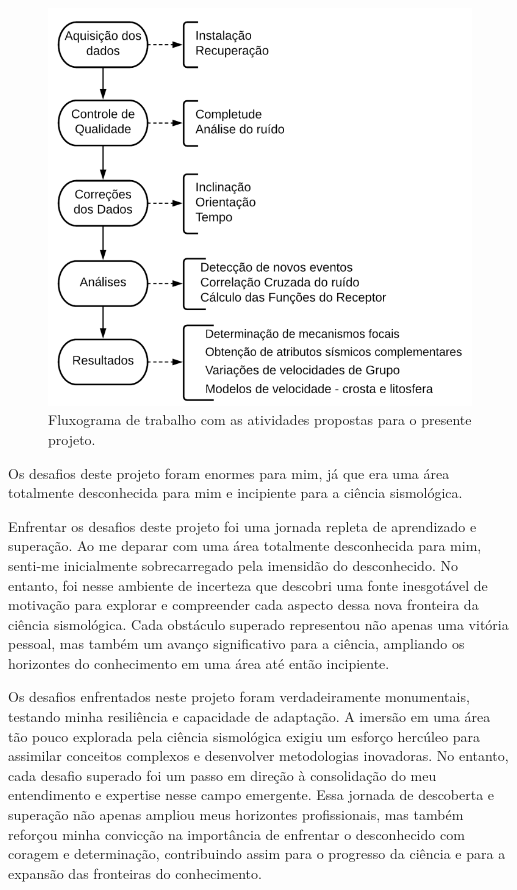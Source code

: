\documentclass[10pt,a4paper,oneside]{book}
\begin{document}
\begin{figure}[h!]
  \begin{center}
    \includegraphics[width=\textwidth]{images/fluxograma_posdoc_ufsc.png}
  \end{center}
  \caption{Fluxograma de trabalho com as atividades propostas para o presente projeto.}
  \label{fluxo_posdoc_ufsc}
\end{figure}

Os desafios deste projeto foram enormes para mim, já que era uma área totalmente desconhecida para mim e incipiente para a ciência sismológica. 


Enfrentar os desafios deste projeto foi uma jornada repleta de aprendizado e superação. Ao me deparar com uma área totalmente desconhecida para mim, senti-me inicialmente sobrecarregado pela imensidão do desconhecido. No entanto, foi nesse ambiente de incerteza que descobri uma fonte inesgotável de motivação para explorar e compreender cada aspecto dessa nova fronteira da ciência sismológica. Cada obstáculo superado representou não apenas uma vitória pessoal, mas também um avanço significativo para a ciência, ampliando os horizontes do conhecimento em uma área até então incipiente.

Os desafios enfrentados neste projeto foram verdadeiramente monumentais, testando minha resiliência e capacidade de adaptação. A imersão em uma área tão pouco explorada pela ciência sismológica exigiu um esforço hercúleo para assimilar conceitos complexos e desenvolver metodologias inovadoras. No entanto, cada desafio superado foi um passo em direção à consolidação do meu entendimento e expertise nesse campo emergente. Essa jornada de descoberta e superação não apenas ampliou meus horizontes profissionais, mas também reforçou minha convicção na importância de enfrentar o desconhecido com coragem e determinação, contribuindo assim para o progresso da ciência e para a expansão das fronteiras do conhecimento.
\end{document}
